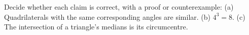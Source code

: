 Decide whether each claim is correct, with a proof or counterexample: (a) Quadrilaterals with the same corresponding angles are similar. (b) $4^3=8$. (c) The intersection of a triangle's medians is its circumcentre.
